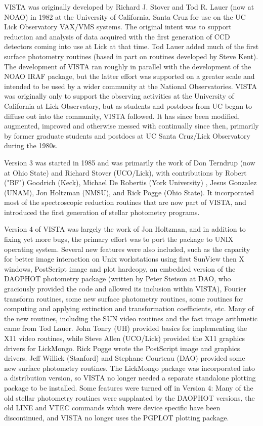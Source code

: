 VISTA was originally developed by Richard J. Stover and Tod R. Lauer (now
at NOAO) in 1982 at the University of California, Santa Cruz for use on the
UC Lick Observatory VAX/VMS systems.  The original intent was to support
reduction and analysis of data acquired with the first generation of CCD
detectors coming into use at Lick at that time.  Tod Lauer added much of
the first surface photometry routines (based in part on routines developed
by Steve Kent).  The development of VISTA ran roughly in parallel with the
development of the NOAO IRAF package, but the latter effort was supported
on a greater scale and intended to be used by a wider community at the
National Observatories.  VISTA was originally only to support the observing
activities at the University of California at Lick Observatory, but as
students and postdocs from UC began to diffuse out into the community,
VISTA followed.  It has since been modified, augmented, improved and
otherwise messed with continually since then, primarily by former graduate
students and postdocs at UC Santa Cruz/Lick Observatory during the 1980s.

Version 3 was started in 1985 and was primarily the work of Don Terndrup
(now at Ohio State) and Richard Stover (UCO/Lick), with contributions by
Robert ("BF") Goodrich (Keck), Michael De Robertis (York University) ,
Jesus Gonzalez (UNAM), Jon Holtzman (NMSU), and Rick Pogge (Ohio State).
It incorporated most of the spectroscopic reduction routines that are now
part of VISTA, and introduced the first generation of stellar photometry
programs.

Version 4 of VISTA was largely the work of Jon Holtzman, and in addition to
fixing yet more bugs, the primary effort was to port the package to UNIX
operating system.  Several new features were also included, such as the
capacity for better image interaction on Unix workstations using first
SunView then X windows, PostScript image and plot hardcopy, an embedded
version of the DAOPHOT photometry package (written by Peter Stetson at DAO,
who graciously provided the code and allowed its inclusion within VISTA),
Fourier transform routines, some new surface photometry routines, some
routines for computing and applying extinction and transformation
coefficients, etc.  Many of the new routines, including the SUN video
routines and the fast image arithmetic came from Tod Lauer.  John Tonry
(UH) provided basics for implementing the X11 video routines, while Steve
Allen (UCO/Lick) provided the X11 graphics drivers for LickMongo.  Rick
Pogge wrote the PostScript image and graphics drivers.  Jeff Willick
(Stanford) and Stephane Courteau (DAO) provided some new surface photometry
routines.  The LickMongo package was incorporated into a distribution
version, so VISTA no longer needed a separate standalone plotting package
to be installed.  Some features were turned off in Version 4: Many of the
old stellar photometry routines were supplanted by the DAOPHOT versions,
the old LINE and VTEC commands which were device specific have been
discontinued, and VISTA no longer uses the PGPLOT plotting package.

